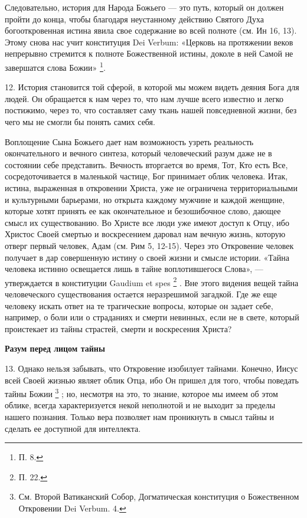 \documentclass[a5paper,10pt]{article}
\begin{document}
Следовательно, история для Народа Божьего — это путь, который он должен пройти
до конца, чтобы благодаря неустанному действию Святого Духа богооткровенная
истина явила свое содержание во всей полноте (см. Ин 16, 13). Этому снова нас
учит конституция Dei Verbum: «Церковь на протяжении веков непрерывно стремится
к полноте Божественной истины, доколе в ней Самой не завершатся слова
Божии» \footnote{П. 8.}.

12. История становится той сферой, в которой мы можем видеть деяния Бога для
людей. Он обращается к нам через то, что нам лучше всего известно и легко
постижимо, через то, что составляет саму ткань нашей повседневной жизни, без
чего мы не смогли бы понять самих себя.

Воплощение Сына Божьего дает нам возможность узреть реальность окончательного и
вечного синтеза, который человеческий разум даже не в состоянии себе
представить. Вечность вторгается во время, Тот, Кто есть Все, сосредоточивается
в маленькой частице, Бог принимает облик человека. Итак, истина, выраженная в
откровении Христа, уже не ограничена территориальными и культурными барьерами,
но открыта каждому мужчине и каждой женщине, которые хотят принять ее как
окончательное и безошибочное слово, дающее смысл их существованию. Во Христе
все люди уже имеют доступ к Отцу, ибо Христос Своей смертью и воскресением
даровал нам вечную жизнь, которую отверг первый человек, Адам (см. Рим 5,
12-15). Через это Откровение человек получает в дар совершенную истину о своей
жизни и смысле истории. «Тайна человека истинно освещается лишь в тайне
воплотившегося Слова», — утверждается в конституции Gaudium et spes
\footnote{П. 22.} . Вне этого видения вещей тайна человеческого существования
остается неразрешимой загадкой. Где же еще человеку искать ответ на те
трагические вопросы, которые он задает себе, например, о боли или о страданиях
и смерти невинных, если не в свете, который проистекает из тайны страстей,
смерти и воскресения Христа?

\textbf{Разум перед лицом тайны}

13. Однако нельзя забывать, что Откровение изобилует тайнами. Конечно, Иисус
всей Своей жизнью являет облик Отца, ибо Он пришел для того, чтобы поведать
тайны Божии \footnote{См. Второй Ватиканский Собор, Догматическая конституция о
Божественном Откровении Dei Verbum. 4.} ; но, несмотря на это, то знание,
которое мы имеем об этом облике, всегда характеризуется некой неполнотой и не
выходит за пределы нашего познания. Только вера позволяет нам проникнуть в
смысл тайны и сделать ее доступной для интеллекта.
\end{document}
